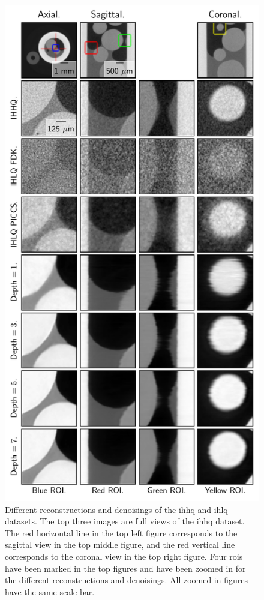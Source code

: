 \begin{figure}[htbp]
  \centering
  \includegraphics[width=.77\textwidth]{figures/bigfigure.pdf}
  \caption[Different reconstructions and denoisings of the IHLQ and IHHQ datasets]{Different reconstructions and denoisings of the \gls{ihhq} and \gls{ihlq} datasets. The top three images are full views of the \gls{ihhq} dataset. The red horizontal line in the top left figure corresponds to the sagittal view in the top middle figure, and the red vertical line corresponds to the coronal view in the top right figure. Four \glspl{roi} have been marked in the top figures and have been zoomed in for the different reconstructions and denoisings. All zoomed in figures have the same scale bar. }
  \label{fig:bigfigure}
\end{figure}


